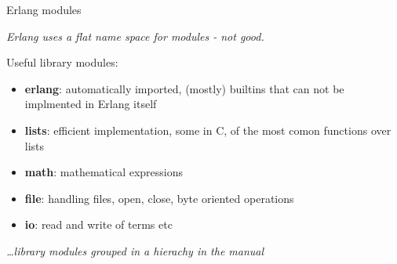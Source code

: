 \begin{frame}{Erlang modules}

{\em Erlang uses a flat name space for modules - not good.}

\pause\vspace{20pt}

Useful library modules:
\pause\vspace{20pt}

\begin{itemize}
\item {\bf erlang}: automatically imported, (mostly) builtins that can not be implmented in Erlang itself
\pause
\item {\bf lists}: efficient implementation, some in C, of the most comon functions over lists
\pause
\item {\bf math}: mathematical expressions
\pause
\item {\bf file}: handling files, open, close, byte oriented operations
\pause
\item {\bf io}: read and write of terms etc
\end{itemize}

\pause\vspace{20pt}

{\em \ldots library modules grouped in a hierachy in the manual}

\end{frame}









